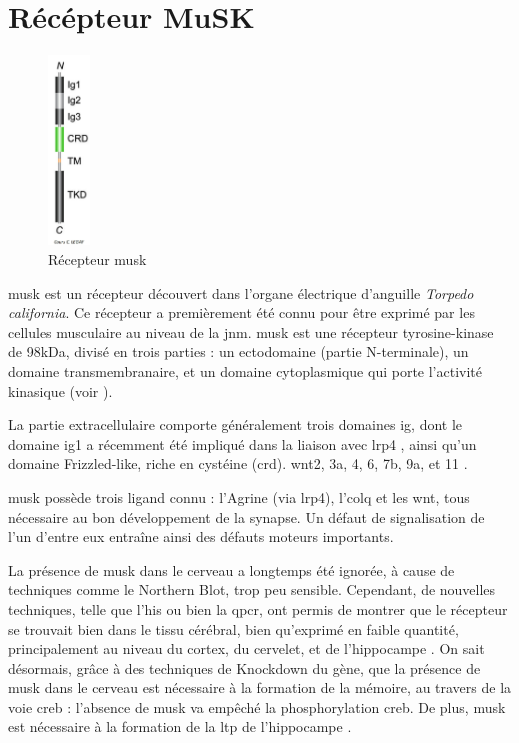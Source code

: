 \section{Récépteur MuSK}
	\label{sec:IntroMuSK}
	
	\begin{figure}
		\includegraphics[width=0.1\textwidth]{./Images/MuSKReceptor.png}	
		\caption{Récepteur \gls{musk}}
		\label{fig:RMuSK}
	\end{figure}

	\gls{musk} est un récepteur découvert dans l'organe électrique d'anguille \emph{Torpedo california}. Ce récepteur a premièrement été connu pour être exprimé par les cellules musculaire au niveau de la \gls{jnm}. \gls{musk} est une récepteur tyrosine-kinase de 98kDa, divisé en trois parties : un ectodomaine (partie N-terminale), un domaine transmembranaire, et un domaine cytoplasmique qui porte l'activité kinasique (voir ). 
	
	La partie extracellulaire comporte généralement trois domaines \gls{ig}, dont le domaine \gls{ig}1 a récemment été impliqué dans la liaison avec \gls{lrp4} \cite{Zhang2011}, ainsi qu'un domaine Frizzled-like, riche en cystéine (\gls{crd}). \gls{wnt}2, 3a, 4, 6, 7b, 9a, et 11 \cite{Stiegler2009}. 
	
	\gls{musk} possède trois ligand connu : l'Agrine (via \gls{lrp4}), l'\gls{colq} et les \gls{wnt}, tous nécessaire au bon développement de la synapse. Un défaut de signalisation de l'un d'entre eux entraîne ainsi des défauts moteurs importants.
	
	La présence de \gls{musk} dans le cerveau a longtemps été ignorée, à cause de techniques comme le Northern Blot, trop peu sensible. Cependant, de nouvelles techniques, telle que l'\gls{his} ou bien la \gls{qpcr}, ont permis de montrer que le récepteur se trouvait bien dans le tissu cérébral, bien qu'exprimé en faible quantité, principalement au niveau du cortex, du cervelet, et de l'hippocampe \cite{Garcia-Osta2006, Ksiazek2007}. On sait désormais, grâce à des techniques de Knockdown du gène, que la présence de \gls{musk} dans le cerveau est nécessaire à la formation de la mémoire, au travers de la voie \gls{creb} : l'absence de \gls{musk} va empêché la phosphorylation \gls{creb}. De plus, \gls{musk} est nécessaire à la formation de la \gls{ltp} de l'hippocampe \cite{Garcia-Osta2006}.
	
